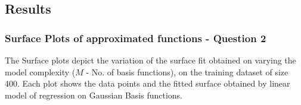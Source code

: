 \documentclass{article}
\begin{document}
\subsection{Results}


\subsubsection{Surface Plots of approximated functions - Question 2}
\begin{flushleft}
The Surface plots depict the variation of the surface fit obtained on varying the model complexity ($M$ - No. of basis functions), on the training dataset of size 400. Each plot shows the data points and the fitted surface obtained by linear model of regression on Gaussian Basis functions.

\end{flushleft}
\end{document}
